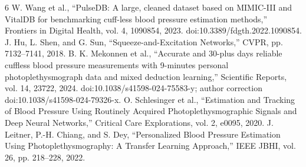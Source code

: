 \documentclass[conference]{IEEEtran}
\begin{document}
\begin{thebibliography}{6}
 W. Wang et al., ``PulseDB: A large, cleaned dataset based on MIMIC-III and VitalDB for benchmarking cuff-less blood pressure estimation methods,'' Frontiers in Digital Health, vol. 4, 1090854, 2023. doi:10.3389/fdgth.2022.1090854.
 J. Hu, L. Shen, and G. Sun, ``Squeeze-and-Excitation Networks,'' CVPR, pp. 7132--7141, 2018.
 B. K. Mekonnen et al., ``Accurate and 30-plus days reliable cuffless blood pressure measurements with 9-minutes personal photoplethysmograph data and mixed deduction learning,'' Scientific Reports, vol. 14, 23722, 2024. doi:10.1038/s41598-024-75583-y; author correction doi:10.1038/s41598-024-79326-x.
 O. Schlesinger et al., ``Estimation and Tracking of Blood Pressure Using Routinely Acquired Photoplethysmographic Signals and Deep Neural Networks,'' Critical Care Explorations, vol. 2, e0095, 2020.
 J. Leitner, P.-H. Chiang, and S. Dey, ``Personalized Blood Pressure Estimation Using Photoplethysmography: A Transfer Learning Approach,'' IEEE JBHI, vol. 26, pp. 218--228, 2022.
\end{thebibliography}

\clearpage
\onecolumn
\end{document}
